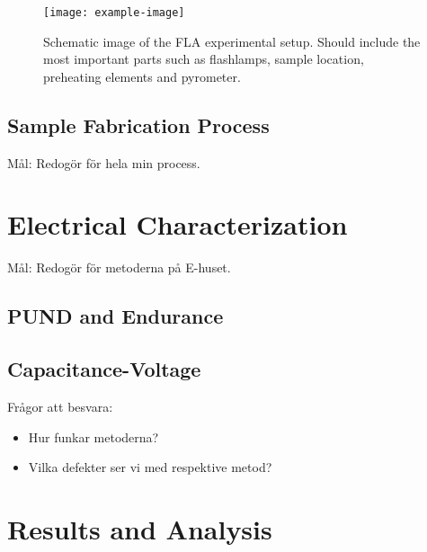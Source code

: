 \documentclass[11pt,twoside]{eitExjobb}
\begin{document}
\begin{figure}
    \centering
    \texttt{[image: example-image]}
    \caption{Schematic image of the FLA experimental setup. Should include the
    most important parts such as flashlamps, sample location, preheating
    elements and pyrometer.}\label{fig:fab_FLAsetup}
\end{figure}

\section{Sample Fabrication Process}\label{sec:FabProc}

Mål: Redogör för hela min process.

\chapter{Electrical Characterization}\label{ch:char}

Mål: Redogör för metoderna på E-huset.

\section{PUND and Endurance}\label{sec:PandE}

\section{Capacitance-Voltage}\label{sec:CV}

Frågor att besvara: 
\begin{itemize}
    \item Hur funkar metoderna? 
    \item Vilka defekter ser vi med respektive metod? 
\end{itemize}

\chapter{Results and Analysis}\label{ch:res}
\end{document}
